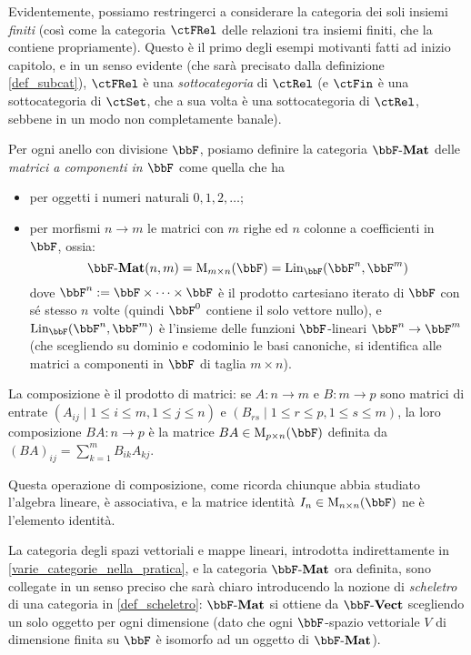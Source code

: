 Evidentemente, possiamo restringerci a considerare la categoria dei soli insiemi \emph{finiti} (così come la categoria \(\ctFRel\) delle relazioni tra insiemi finiti, che la contiene propriamente). Questo è il primo degli esempi motivanti fatti ad inizio capitolo, e in un senso evidente (che sarà precisato dalla definizione \ref{def_subcat}), \(\ctFRel\) è una \emph{sottocategoria} di \(\ctRel\) (e \(\ctFin\) è una sottocategoria di \(\ctSet\), che a sua volta è una sottocategoria di \(\ctRel\), sebbene in un modo non completamente banale).
\begin{example}\label{ex_cat_matrici}
	Per ogni anello con divisione \(\bbF\), posiamo definire la categoria \(\ctMat\) delle \emph{matrici a componenti in \(\bbF\)} come quella che ha
	\begin{itemize}
		\item per oggetti i numeri naturali \(0,1,2,\dots\);
		\item per morfismi \(n\to m\) le matrici con \(m\) righe ed \(n\) colonne a coefficienti in \(\bbF\), ossia:
		      \[\ctMat(n,m) = \matrici mn\bbF = \text{Lin}_{\bbF}(\bbF^n,\bbF^m)\]
		      dove \(\bbF^n:=\bbF \times\dots\times\bbF\) è il prodotto cartesiano iterato di \(\bbF\) con sé stesso \(n\) volte (quindi \(\bbF^0\) contiene il solo vettore nullo), e \(\text{Lin}_{\bbF}(\bbF^n,\bbF^m)\) è l'insieme delle funzioni \(\bbF\)-lineari \(\bbF^n\to\bbF^m\) (che scegliendo su dominio e codominio le basi canoniche, si identifica alle matrici a componenti in \(\bbF\) di taglia \(m\times n\)).
	\end{itemize}
	La composizione è il prodotto di matrici: se \(A : n\to m\) e \(B : m\to p\) sono matrici di entrate \((A_{ij}\mid 1\le i\le m,1\le j\le n)\) e \((B_{rs}\mid 1\le r\le p,1\le s\le m)\), la loro composizione \(BA : n\to p\) è la matrice \(BA\in \matrici pn\bbF\) definita da \((BA)_{ij} = \sum_{k=1}^m B_{ik}A_{kj}\).

	Questa operazione di composizione, come ricorda chiunque abbia studiato l'algebra lineare, è associativa, e la matrice identità \(I_n\in \matrici nn\bbF\) ne è l'elemento identità.
\end{example}
\begin{remark}
	La categoria degli spazi vettoriali e mappe lineari, introdotta indirettamente in \ref{varie_categorie_nella_pratica}, e la categoria \(\ctMat\) ora definita, sono collegate in un senso preciso che sarà chiaro introducendo la nozione di \emph{scheletro} di una categoria in \ref{def_scheletro}: \(\ctMat\) si ottiene da \(\ctVect\) scegliendo un solo oggetto per ogni dimensione (dato che ogni \(\bbF\)-spazio vettoriale \(V\) di dimensione finita su \(\bbF\) è isomorfo ad un oggetto di \(\ctMat\)).
\end{remark}
